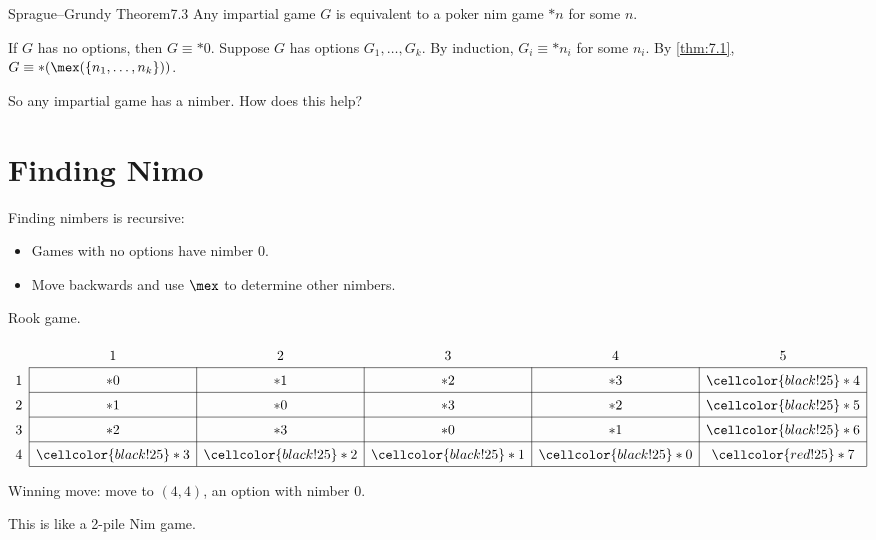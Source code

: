\documentclass[12pt,letterpaper]{report}
\begin{document}
\begin{thm}{Sprague--Grundy Theorem}{7.3}
  Any impartial game $G$ is equivalent to a poker nim game $*n$ for some $n$.
\end{thm}

\begin{thmproof}
  If $G$ has no options, then $G \equiv *0$.
  Suppose $G$ has options $G_1, \ldots, G_k$.
  By induction, $G_i \equiv *n_i$ for some $n_i$.
  By \cref{thm:7.1}, $G \equiv *(\mex(\{n_1, \ldots, n_k\}))$.
\end{thmproof}

So any impartial game has a nimber.
How does this help?

\section{Finding Nimo}

Finding nimbers is recursive:
\begin{itemize}
  \item Games with no options have nimber 0.
  \item Move backwards and use $\mex$ to determine other nimbers.
\end{itemize}

\begin{ex}
  Rook game.

  \begin{minipage}{0.4\textwidth}
    \centering
    \[
      \renewcommand{\arraystretch}{1.5}
      \begin{array}{c|c|c|c|c|c|}
        \multicolumn{1}{c}{} & \multicolumn{1}{c}{1} & \multicolumn{1}{c}{2} & \multicolumn{1}{c}{3}
          & \multicolumn{1}{c}{4} & \multicolumn{1}{c}{5} \\
        \cline{2-6}
        1 & *0 & *1 & *2 & *3 & \cellcolor{black!25} *4 \\
        \cline{2-6}
        2 & *1 & *0 & *3 & *2 & \cellcolor{black!25} *5 \\
        \cline{2-6}
        3 & *2 & *3 & *0 & *1 & \cellcolor{black!25} *6 \\
        \cline{2-6}
        4 & \cellcolor{black!25} *3 & \cellcolor{black!25} *2 & \cellcolor{black!25} *1
          & \cellcolor{black!25} *0 & \cellcolor{red!25}*7 \\
        \cline{2-6}
      \end{array}
    \]
  \end{minipage}\hfill
  \begin{minipage}{0.55\textwidth}
    Winning move: move to $(4, 4)$, an option with nimber 0.

    \vspace{\baselineskip}
    This is like a 2-pile Nim game.
  \end{minipage}
\end{ex}
\end{document}
